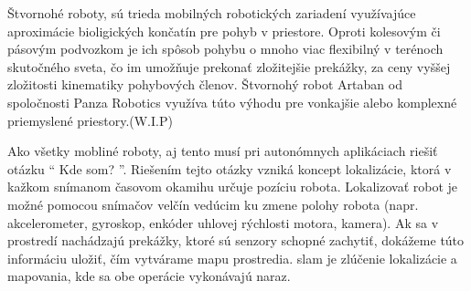 Štvornohé roboty, sú trieda mobilných robotických zariadení využívajúce aproximácie bioligických končatín pre pohyb v priestore.\newline
Oproti kolesovým či pásovým podvozkom je ich spôsob pohybu o mnoho viac flexibilný v terénoch skutočného sveta, čo im umožňuje prekonať zložitejšie prekážky, za ceny vyššej zložitosti kinematiky pohybových členov.\newline
Štvornohý robot Artaban od spoločnosti Panza Robotics využíva túto výhodu pre vonkajšie alebo komplexné priemyslené priestory.(W.I.P)

Ako všetky mobliné roboty, aj tento musí pri autonómnych aplikáciach riešiť otázku `` Kde som? ''.\newline
Riešením tejto otázky vzniká koncept lokalizácie, ktorá v kažkom snímanom časovom okamihu určuje pozíciu robota. Lokalizovať robot je možné pomocou snímačov velčín vedúcim ku zmene polohy robota (napr. akcelerometer, gyroskop, enkóder uhlovej rýchlosti motora, kamera).\newline
Ak sa v prostredí nachádzajú prekážky, ktoré sú senzory schopné zachytiť, dokážeme túto informáciu uložiť, čím vytvárame mapu prostredia.\newline
\acrshort{slam} je zlúčenie lokalizácie a mapovania, kde sa obe operácie vykonávajú naraz.